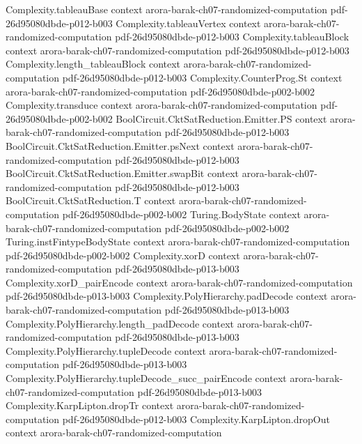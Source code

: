 \begin{theorem}
\proofstep
  {Complexity.tableauBase}
  {context}
  {arora-barak-ch07-randomized-computation}
  {pdf-26d95080dbde-p012-b003}
\proofstep
  {Complexity.tableauVertex}
  {context}
  {arora-barak-ch07-randomized-computation}
  {pdf-26d95080dbde-p012-b003}
\proofstep
  {Complexity.tableauBlock}
  {context}
  {arora-barak-ch07-randomized-computation}
  {pdf-26d95080dbde-p012-b003}
\proofstep
  {Complexity.length_tableauBlock}
  {context}
  {arora-barak-ch07-randomized-computation}
  {pdf-26d95080dbde-p012-b003}
\proofstep
  {Complexity.CounterProg.St}
  {context}
  {arora-barak-ch07-randomized-computation}
  {pdf-26d95080dbde-p002-b002}
\proofstep
  {Complexity.transduce}
  {context}
  {arora-barak-ch07-randomized-computation}
  {pdf-26d95080dbde-p002-b002}
\proofstep
  {BoolCircuit.CktSatReduction.Emitter.PS}
  {context}
  {arora-barak-ch07-randomized-computation}
  {pdf-26d95080dbde-p012-b003}
\proofstep
  {BoolCircuit.CktSatReduction.Emitter.psNext}
  {context}
  {arora-barak-ch07-randomized-computation}
  {pdf-26d95080dbde-p012-b003}
\proofstep
  {BoolCircuit.CktSatReduction.Emitter.swapBit}
  {context}
  {arora-barak-ch07-randomized-computation}
  {pdf-26d95080dbde-p012-b003}
\proofstep
  {BoolCircuit.CktSatReduction.T}
  {context}
  {arora-barak-ch07-randomized-computation}
  {pdf-26d95080dbde-p002-b002}
\proofstep
  {Turing.BodyState}
  {context}
  {arora-barak-ch07-randomized-computation}
  {pdf-26d95080dbde-p002-b002}
\proofstep
  {Turing.instFintypeBodyState}
  {context}
  {arora-barak-ch07-randomized-computation}
  {pdf-26d95080dbde-p002-b002}
\proofstep
  {Complexity.xorD}
  {context}
  {arora-barak-ch07-randomized-computation}
  {pdf-26d95080dbde-p013-b003}
\proofstep
  {Complexity.xorD_pairEncode}
  {context}
  {arora-barak-ch07-randomized-computation}
  {pdf-26d95080dbde-p013-b003}
\proofstep
  {Complexity.PolyHierarchy.padDecode}
  {context}
  {arora-barak-ch07-randomized-computation}
  {pdf-26d95080dbde-p013-b003}
\proofstep
  {Complexity.PolyHierarchy.length_padDecode}
  {context}
  {arora-barak-ch07-randomized-computation}
  {pdf-26d95080dbde-p013-b003}
\proofstep
  {Complexity.PolyHierarchy.tupleDecode}
  {context}
  {arora-barak-ch07-randomized-computation}
  {pdf-26d95080dbde-p013-b003}
\proofstep
  {Complexity.PolyHierarchy.tupleDecode_succ_pairEncode}
  {context}
  {arora-barak-ch07-randomized-computation}
  {pdf-26d95080dbde-p013-b003}
\proofstep
  {Complexity.KarpLipton.dropTr}
  {context}
  {arora-barak-ch07-randomized-computation}
  {pdf-26d95080dbde-p012-b003}
\proofstep
  {Complexity.KarpLipton.dropOut}
  {context}
  {arora-barak-ch07-randomized-computation}

\end{theorem}
